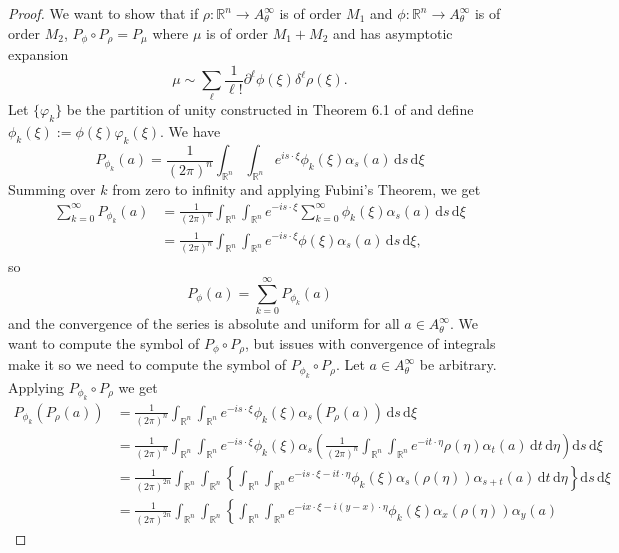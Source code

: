 \documentclass[10pt]{article}
\theoremstyle{remark}
\theoremstyle{definition}
\begin{document}
\begin{proof}
We want to show that if $\rho:\mathbb R^n\rightarrow A_{\theta}^{\infty}$
is of order $M_1$ and $\phi:\mathbb R^n\rightarrow A_{\theta}^{\infty}$
is of order $M_2$, $P_{\phi}\circ P_{\rho}=P_{\mu}$
where $\mu$ is of order $M_1+M_2$ and has asymptotic expansion
$$\mu\sim\sum_{\ell}\frac{1}{\ell!}
\partial^{\ell}\phi(\xi)\delta^{\ell}\rho(\xi).$$
Let $\{\varphi_k\}$ be the partition of unity constructed in Theorem 6.1 of
\cite{wong} and define $\phi_k(\xi):=\phi(\xi)\varphi_k(\xi)$.
We have $$P_{\phi_k}(a)=\frac{1}{(2\pi)^n}
\int_{\mathbb R^n}\!\int_{\mathbb R^n}\!
e^{is\cdot\xi}\phi_k(\xi)\alpha_s(a)\,\mathrm ds\,\mathrm d\xi$$
Summing over $k$ from zero to infinity and applying Fubini's Theorem, we get
\begin{align*}
\sum_{k=0}^{\infty}P_{\phi_k}(a)
&=\frac{1}{(2\pi)^n}\int_{\mathbb R^n}\!\int_{\mathbb R^n}\!
e^{-is\cdot\xi}\sum_{k=0}^{\infty}\phi_k(\xi)\alpha_s(a)
\,\mathrm ds\,\mathrm d\xi \\
&=\frac{1}{(2\pi)^n}\int_{\mathbb R^n}\!\int_{\mathbb R^n}\!
e^{-is\cdot\xi}\phi(\xi)\alpha_s(a)
\,\mathrm ds\,\mathrm d\xi,
\end{align*}
so $$P_{\phi}(a)=\sum_{k=0}^{\infty}P_{\phi_k}(a)$$ and the convergence
of the series is absolute and uniform for all $a\in A_{\theta}^{\infty}$.
We want to compute the symbol of $P_{\phi}\circ P_{\rho}$, but issues with
convergence of integrals make it so we need to compute the symbol of
$P_{\phi_k}\circ P_{\rho}$. Let $a\in A_{\theta}^{\infty}$ be arbitrary.
Applying $P_{\phi_k}\circ P_{\rho}$ we get
\begin{align*}
P_{\phi_k}(P_{\rho}(a))
&=\frac{1}{(2\pi)^n}\int_{\mathbb R^n}\!\int_{\mathbb R^n}\!
e^{-is\cdot\xi}\phi_k(\xi)\alpha_s(P_{\rho}(a))\,\mathrm ds\,\mathrm d\xi \\
&=\frac{1}{(2\pi)^n}\int_{\mathbb R^n}\!\int_{\mathbb R^n}\!
e^{-is\cdot\xi}\phi_k(\xi)\alpha_s\!\!\left(
\frac{1}{(2\pi)^n}\int_{\mathbb R^n}\!\int_{\mathbb R^n}\!
e^{-it\cdot\eta}\rho(\eta)\alpha_t(a)\,\mathrm dt\,\mathrm d\eta
\right)\mathrm ds\,\mathrm d\xi \\
&=\frac{1}{(2\pi)^{2n}}\int_{\mathbb R^n}\!\int_{\mathbb R^n}\!\!
\left\{\int_{\mathbb R^n}\!\int_{\mathbb R^n}\!
e^{-is\cdot\xi-it\cdot\eta}\phi_k(\xi)\alpha_s(\rho(\eta))\alpha_{s+t}(a)
\,\mathrm dt\,\mathrm d\eta\right\}\mathrm ds\,\mathrm d\xi \\
&=\frac{1}{(2\pi)^{2n}}\int_{\mathbb R^n}\!\int_{\mathbb R^n}\!\!
\left\{\int_{\mathbb R^n}\!\int_{\mathbb R^n}\!
e^{-ix\cdot\xi-i(y-x)\cdot\eta}\phi_k(\xi)\alpha_x(\rho(\eta))\alpha_y(a)

\end{align*}
\end{proof}
\end{document}
